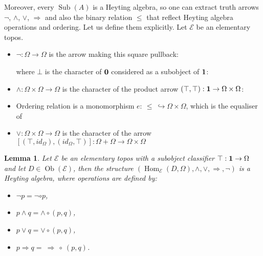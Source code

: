 \documentclass[a4paper]{article}
\theoremstyle{defin}
\theoremstyle{theorem}
\theoremstyle{claim}
\theoremstyle{prop}
\theoremstyle{lemma}
\newtheorem{lemma}{Lemma}
\theoremstyle{fact}
\theoremstyle{ex}
\theoremstyle{col}
\begin{document}
Moreover, every $\operatorname{Sub}(A)$ is a Heyting algebra, so one can extract truth arrows $\neg$, $\land$, $\vee$, $\Rightarrow$ and also the binary relation $\leq$ that reflect Heyting algebra operations and ordering. Let us define them explicitly. Let $\mathcal{E}$ be an elementary topos.
\begin{itemize}
\item $\neg : \Omega \to \Omega$ is the arrow making this square pullback:

\centerline{
}

where $\bot$ is the character of ${\bf 0}$ considered as a subobject of ${\bf 1}$:

\centerline{
}
\item $\wedge : \Omega \times \Omega \to \Omega$ is the character of the product arrow $(\top, \top) : {\bf 1} \to \Omega \times \Omega$:

\centerline{
}
\item Ordering relation is a monomorphism $e : \: \leq \: \hookrightarrow \Omega \times \Omega$, which is the equaliser of

\centerline{
}

\item $\vee : \Omega \times \Omega \to \Omega$ is the character of the arrow $[(\top, id_{\Omega}),(id_{\Omega}, \top)] : \Omega + \Omega \to \Omega \times \Omega$
\end{itemize}

\begin{lemma}
Let $\mathcal{E}$ be an elementary topos with a subobject classifier $\top : {\bf 1} \to \Omega$ and let $D \in \operatorname{Ob}(\mathcal{E})$, then the structure $(\operatorname{Hom}_{\mathcal{E}}(D, \Omega), \wedge, \vee, \Rightarrow, \neg)$ is a Heyting algebra, where operations are defined by:

\begin{itemize}
\item $\neg p = \neg \circ p$,
\item $p \wedge q = \wedge \circ (p, q)$,
\item $p \vee q = \vee \circ (p, q)$,
\item $p \Rightarrow q = \: \Rightarrow \: \circ \: (p, q)$.
\end{itemize}
\end{lemma}
\end{document}
